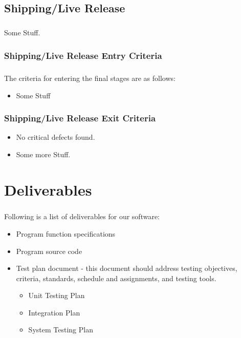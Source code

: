 \documentclass[a4paper,10pt]{scrreprt}
\begin{document}
\section{Shipping/Live Release}
\paragraph{}
Some Stuff.
\subsection{Shipping/Live Release Entry Criteria}
\paragraph{}
The criteria for entering the final stages are as follows:
\begin{itemize}
	\item Some Stuff
\end{itemize}
\subsection{Shipping/Live Release Exit Criteria}
\begin{itemize}
	\item No critical defects found.
	\item Some more Stuff.
\end{itemize}
\chapter{Deliverables}
\paragraph{}
Following is a list of deliverables for our software:
\begin{itemize}
	\item Program function specifications
	\item Program source code
	\item Test plan document - this document should address testing objectives, criteria, standards, schedule and assignments, and testing tools.
	\begin{itemize}
		\item Unit Testing Plan
		\item Integration Plan
		\item System Testing Plan
	\end{itemize}
\end{itemize}
\end{document}
